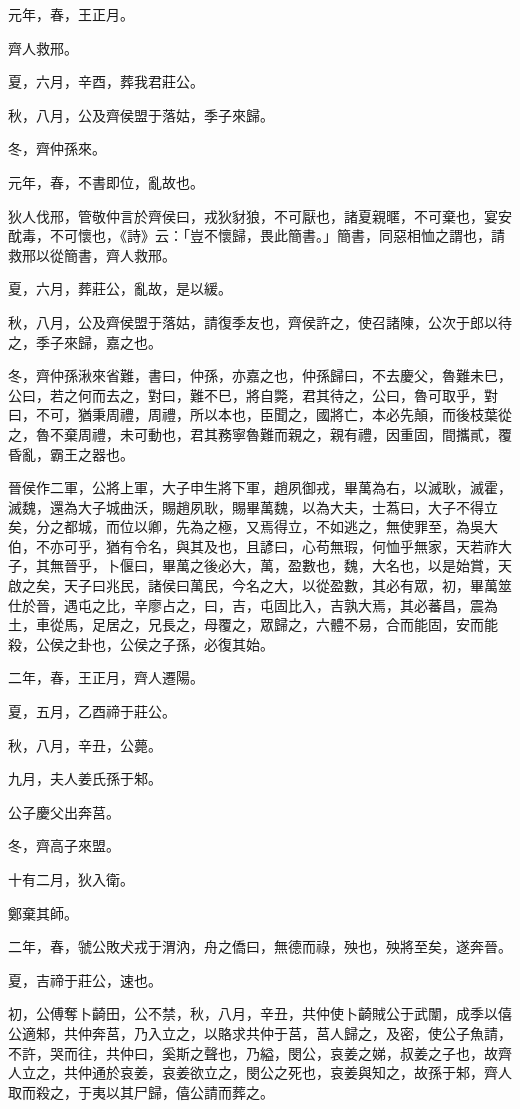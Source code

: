 
\begin{pinyinscope}
元年，春，王正月。

齊人救邢。

夏，六月，辛酉，葬我君莊公。

秋，八月，公及齊侯盟于落姑，季子來歸。

冬，齊仲孫來。

元年，春，不書即位，亂故也。

狄人伐邢，管敬仲言於齊侯曰，戎狄豺狼，不可厭也，諸夏親暱，不可棄也，宴安酖毒，不可懷也，《詩》云：「豈不懷歸，畏此簡書。」簡書，同惡相恤之謂也，請救邢以從簡書，齊人救邢。

夏，六月，葬莊公，亂故，是以緩。

秋，八月，公及齊侯盟于落姑，請復季友也，齊侯許之，使召諸陳，公次于郎以待之，季子來歸，嘉之也。

冬，齊仲孫湫來省難，書曰，仲孫，亦嘉之也，仲孫歸曰，不去慶父，魯難未巳，公曰，若之何而去之，對曰，難不巳，將自斃，君其待之，公曰，魯可取乎，對曰，不可，猶秉周禮，周禮，所以本也，臣聞之，國將亡，本必先顛，而後枝葉從之，魯不棄周禮，未可動也，君其務寧魯難而親之，親有禮，因重固，間攜貳，覆昏亂，霸王之器也。

晉侯作二軍，公將上軍，大子申生將下軍，趙夙御戎，畢萬為右，以滅耿，滅霍，滅魏，還為大子城曲沃，賜趙夙耿，賜畢萬魏，以為大夫，士蒍曰，大子不得立矣，分之都城，而位以卿，先為之極，又焉得立，不如逃之，無使罪至，為吳大伯，不亦可乎，猶有令名，與其及也，且諺曰，心苟無瑕，何恤乎無家，天若祚大子，其無晉乎，卜偃曰，畢萬之後必大，萬，盈數也，魏，大名也，以是始賞，天啟之矣，天子曰兆民，諸侯曰萬民，今名之大，以從盈數，其必有眾，初，畢萬筮仕於晉，遇屯之比，辛廖占之，曰，吉，屯固比入，吉孰大焉，其必蕃昌，震為土，車從馬，足居之，兄長之，母覆之，眾歸之，六體不易，合而能固，安而能殺，公侯之卦也，公侯之子孫，必復其始。

二年，春，王正月，齊人遷陽。

夏，五月，乙酉禘于莊公。

秋，八月，辛丑，公薨。

九月，夫人姜氏孫于邾。

公子慶父出奔莒。

冬，齊高子來盟。

十有二月，狄入衛。

鄭棄其師。

二年，春，虢公敗犬戎于渭汭，舟之僑曰，無德而祿，殃也，殃將至矣，遂奔晉。

夏，吉禘于莊公，速也。

初，公傅奪卜齮田，公不禁，秋，八月，辛丑，共仲使卜齮賊公于武闈，成季以僖公適邾，共仲奔莒，乃入立之，以賂求共仲于莒，莒人歸之，及密，使公子魚請，不許，哭而往，共仲曰，奚斯之聲也，乃縊，閔公，哀姜之娣，叔姜之子也，故齊人立之，共仲通於哀姜，哀姜欲立之，閔公之死也，哀姜與知之，故孫于邾，齊人取而殺之，于夷以其尸歸，僖公請而葬之。


\end{pinyinscope}

